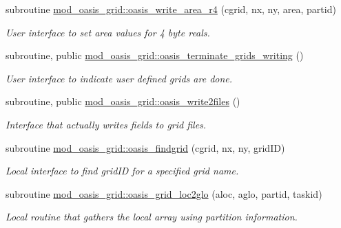 \begin{DoxyCompactItemize}
subroutine \hyperlink{namespacemod__oasis__grid_ad1d3e95cf63a2277b82167ec6c8148d4}{mod\+\_\+oasis\+\_\+grid\+::oasis\+\_\+write\+\_\+area\+\_\+r4} (cgrid, nx, ny, area, partid)
\begin{DoxyCompactList}\small\item\em User interface to set area values for 4 byte reals. \end{DoxyCompactList}\item 
subroutine, public \hyperlink{namespacemod__oasis__grid_a59755e271ccdd0c98807b5938ef33e78}{mod\+\_\+oasis\+\_\+grid\+::oasis\+\_\+terminate\+\_\+grids\+\_\+writing} ()
\begin{DoxyCompactList}\small\item\em User interface to indicate user defined grids are done. \end{DoxyCompactList}\item 
subroutine, public \hyperlink{namespacemod__oasis__grid_a275791c512cefae9799e188d92b6f9d4}{mod\+\_\+oasis\+\_\+grid\+::oasis\+\_\+write2files} ()
\begin{DoxyCompactList}\small\item\em Interface that actually writes fields to grid files. \end{DoxyCompactList}\item 
subroutine \hyperlink{namespacemod__oasis__grid_aa1b2c3dc81299472185c1e7142d143e0}{mod\+\_\+oasis\+\_\+grid\+::oasis\+\_\+findgrid} (cgrid, nx, ny, grid\+ID)
\begin{DoxyCompactList}\small\item\em Local interface to find grid\+ID for a specified grid name. \end{DoxyCompactList}\item 
subroutine \hyperlink{namespacemod__oasis__grid_a5aba1fce549be5f9db2fda5374d588e1}{mod\+\_\+oasis\+\_\+grid\+::oasis\+\_\+grid\+\_\+loc2glo} (aloc, aglo, partid, taskid)
\begin{DoxyCompactList}\small\item\em Local routine that gathers the local array using partition information. \end{DoxyCompactList}\end{DoxyCompactItemize}
